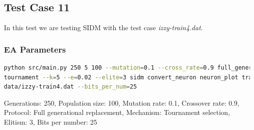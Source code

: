 \subsection{Test Case 11}\label{sec:test-case-11}
In this test we are testing SIDM with the test case
\textit{izzy-train4.dat}.
\subsubsection{EA Parameters}\label{sec:test-case-11-parameters}
\begin{lstlisting}[frame=single, language=bash, caption=Command-line to
replicate the results]
python src/main.py 250 5 100 --mutation=0.1 --cross_rate=0.9 full_generational
tournament --k=5 --e=0.02 --elite=3 sidm convert_neuron neuron_plot training\
data/izzy-train4.dat --bits_per_num=25
\end{lstlisting}
Generations: 250, Population size: 100, Mutation rate: 0.1, Crossover rate: 0.9, Protocol: Full generational replacement, Mechanism: Tournament selection, Elitism: 3, Bits per number: 25
